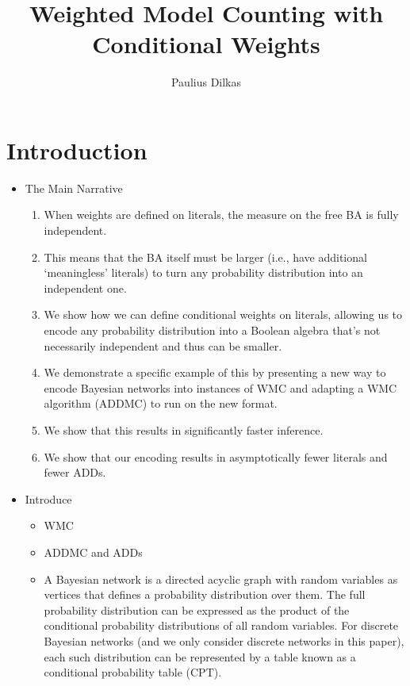 \documentclass{article}
\title{Weighted Model Counting with Conditional Weights}
\author{Paulius Dilkas}
\theoremstyle{definition}
\theoremstyle{remark}
\begin{document}
\maketitle

\section{Introduction}

\begin{itemize}
\item The Main Narrative
  \begin{enumerate}
  \item When weights are defined on literals, the measure on the free BA is
    fully independent.
  \item This means that the BA itself must be larger (i.e., have additional
    `meaningless' literals) to turn any probability distribution into an
    independent one.
  \item We show how we can define conditional weights on literals, allowing us
    to encode any probability distribution into a Boolean algebra that's not
    necessarily independent and thus can be smaller.
  \item We demonstrate a specific example of this by presenting a new way to
    encode Bayesian networks into instances of WMC and adapting a WMC algorithm
    (ADDMC) to run on the new format.
  \item We show that this results in significantly faster inference.
  \item We show that our encoding results in asymptotically fewer literals and
    fewer ADDs.
  \end{enumerate}
\item Introduce
  \begin{itemize}
  \item WMC
  \item ADDMC \cite{DBLP:conf/aaai/DudekPV20} and ADDs
    \cite{DBLP:journals/fmsd/BaharFGHMPS97}
  \item A Bayesian network is a directed acyclic graph with random variables as
    vertices that defines a probability distribution over them. The full
    probability distribution can be expressed as the product of the conditional
    probability distributions of all random variables. For discrete Bayesian
    networks (and we only consider discrete networks in this paper), each such
    distribution can be represented by a table known as a conditional
    probability table (CPT).
  \end{itemize}

\end{itemize}
\end{document}

